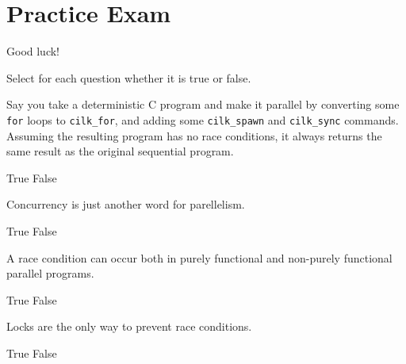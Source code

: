 \chapter{Practice Exam}
\label{ch:exam-practice}

\begin{preamble}
Good luck!
\end{preamble}

\begin{cluster}

\begin{gram}
Select for each question whether it is true or false.
\end{gram}

\begin{parts}
\begin{problem}[blah][2]
Say you take a deterministic C program and make it
parallel by converting some \texttt{for} loops to \texttt{cilk\_for},
and adding some \texttt{cilk\_spawn} and \texttt{cilk\_sync} commands.
Assuming the resulting program has no race conditions, it always
returns the same result as the original sequential program.

\begin{pickone}
\choice True
\correctchoice False
\end{pickone}

\end{problem}

\begin{problem}[2]
Concurrency is just another word for parellelism.  
\begin{pickone}
\choice True
\correctchoice False
\end{pickone}
\end{problem}

\begin{problem}[2]
A race condition can occur both in purely functional and non-purely
functional parallel programs.
\begin{pickone}
\choice True
\correctchoice False
\end{pickone}
\end{problem}

\begin{problem}[2]
Locks are the only way to prevent race conditions.
\begin{pickone}
\choice True
\correctchoice False
\end{pickone}
\end{problem}


\end{parts}
\end{cluster}
